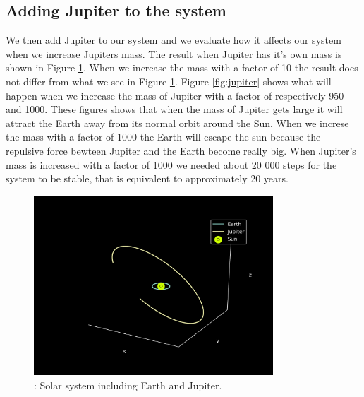 \documentclass{article}
\begin{document}
\subsection{Adding Jupiter to the system}
We then add Jupiter to our system and we evaluate how it affects our system when we increase Jupiters mass. The result when Jupiter has it's own mass is shown in Figure \ref{fig:jupiter1}. When we increase the mass with a factor of 10 the result does not differ from what we see in Figure \ref{fig:jupiter1}. Figure \ref{fig:jupiter} shows what will happen when we increase the mass of Jupiter with a factor of respectively 950 and 1000. These figures shows that when the mass of Jupiter gets large it will attract the Earth away from its normal orbit around the Sun. When we increse the mass with a factor of 1000 the Earth will escape the sun because the repulsive force bewteen Jupiter and the Earth become really big. When Jupiter's mass is increased with a factor of 1000 we needed about 20 000 steps for the system to be stable, that is equivalent to approximately 20 years.

\begin{figure}[H]
    \begin{center}
        \includegraphics[width=0.8\textwidth]{./Plot/Earth_Jupiter1.png}
        \caption{: Solar system including Earth and Jupiter.}
        \label{fig:jupiter1}
    \end{center}
\end{figure}
\end{document}
